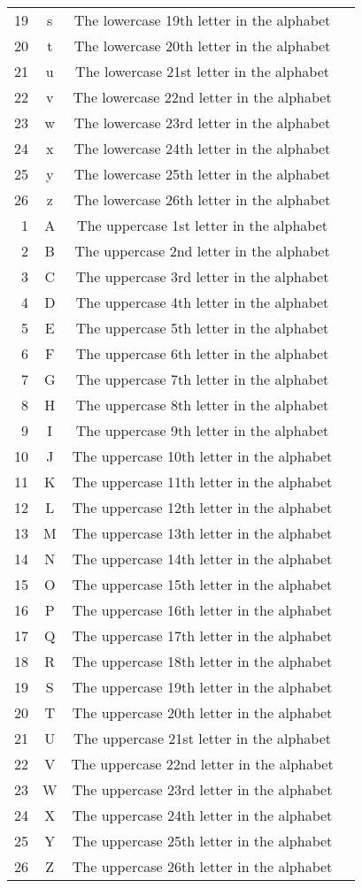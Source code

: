 \begin{longtable}{rccl}
  19 & s & The lowercase 19th letter in the alphabet\\
  20 & t & The lowercase 20th letter in the alphabet\\
  21 & u & The lowercase 21st letter in the alphabet\\
  22 & v & The lowercase 22nd letter in the alphabet\\
  23 & w & The lowercase 23rd letter in the alphabet\\
  24 & x & The lowercase 24th letter in the alphabet\\
  25 & y & The lowercase 25th letter in the alphabet\\
  26 & z & The lowercase 26th letter in the alphabet\\
   1 & A & The uppercase 1st letter in the alphabet\\
   2 & B & The uppercase 2nd letter in the alphabet\\
   3 & C & The uppercase 3rd letter in the alphabet\\
   4 & D & The uppercase 4th letter in the alphabet\\
   5 & E & The uppercase 5th letter in the alphabet\\
   6 & F & The uppercase 6th letter in the alphabet\\
   7 & G & The uppercase 7th letter in the alphabet\\
   8 & H & The uppercase 8th letter in the alphabet\\
   9 & I & The uppercase 9th letter in the alphabet\\
  10 & J & The uppercase 10th letter in the alphabet\\
  11 & K & The uppercase 11th letter in the alphabet\\
  12 & L & The uppercase 12th letter in the alphabet\\
  13 & M & The uppercase 13th letter in the alphabet\\
  14 & N & The uppercase 14th letter in the alphabet\\
  15 & O & The uppercase 15th letter in the alphabet\\
  16 & P & The uppercase 16th letter in the alphabet\\
  17 & Q & The uppercase 17th letter in the alphabet\\
  18 & R & The uppercase 18th letter in the alphabet\\
  19 & S & The uppercase 19th letter in the alphabet\\
  20 & T & The uppercase 20th letter in the alphabet\\
  21 & U & The uppercase 21st letter in the alphabet\\
  22 & V & The uppercase 22nd letter in the alphabet\\
  23 & W & The uppercase 23rd letter in the alphabet\\
  24 & X & The uppercase 24th letter in the alphabet\\
  25 & Y & The uppercase 25th letter in the alphabet\\
  26 & Z & The uppercase 26th letter in the alphabet\\
\end{longtable}
